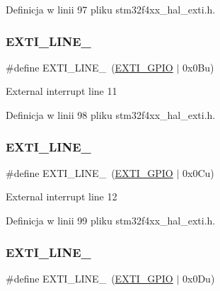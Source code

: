 Definicja w linii 97 pliku stm32f4xx\+\_\+hal\+\_\+exti.\+h.

\mbox{\label{group___e_x_t_i___line_ga301648b2965852f535209429f71e251b}} 
\subsubsection{\texorpdfstring{E\+X\+T\+I\+\_\+\+L\+I\+N\+E\+\_}{EXTI\_LINE\_11}}
{\footnotesize\ttfamily \#define E\+X\+T\+I\+\_\+\+L\+I\+N\+E\+\_~(\hyperlink{group___e_x_t_i___private___constants_gacfa322960fc87db022536119cabb4d2a}{E\+X\+T\+I\+\_\+\+G\+P\+IO}       $\vert$ 0x0\+Bu)}

External interrupt line 11 

Definicja w linii 98 pliku stm32f4xx\+\_\+hal\+\_\+exti.\+h.

\mbox{\label{group___e_x_t_i___line_ga4ff15c98aec7cd3fd0f0c5bd5cfaa501}} 
\subsubsection{\texorpdfstring{E\+X\+T\+I\+\_\+\+L\+I\+N\+E\+\_}{EXTI\_LINE\_12}}
{\footnotesize\ttfamily \#define E\+X\+T\+I\+\_\+\+L\+I\+N\+E\+\_~(\hyperlink{group___e_x_t_i___private___constants_gacfa322960fc87db022536119cabb4d2a}{E\+X\+T\+I\+\_\+\+G\+P\+IO}       $\vert$ 0x0\+Cu)}

External interrupt line 12 

Definicja w linii 99 pliku stm32f4xx\+\_\+hal\+\_\+exti.\+h.

\mbox{\label{group___e_x_t_i___line_ga8e144f1beae1e5d259f5d4aed6a3efe0}} 
\subsubsection{\texorpdfstring{E\+X\+T\+I\+\_\+\+L\+I\+N\+E\+\_}{EXTI\_LINE\_13}}
{\footnotesize\ttfamily \#define E\+X\+T\+I\+\_\+\+L\+I\+N\+E\+\_~(\hyperlink{group___e_x_t_i___private___constants_gacfa322960fc87db022536119cabb4d2a}{E\+X\+T\+I\+\_\+\+G\+P\+IO}       $\vert$ 0x0\+Du)}


